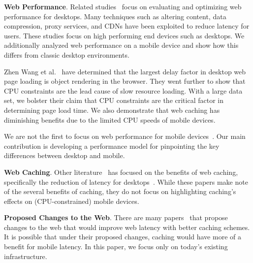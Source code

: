 \textbf{Web Performance}. Related studies~\cite{web-perf-2, web-perf-3} focus on evaluating and optimizing web performance for desktops. Many techniques such as altering content, data compression, proxy services, and CDNs have been exploited to reduce latency for users. These studies focus on high performing end devices such as desktops. We additionally analyzed web performance on a mobile device and show how this differs from classic desktop environments.

Zhen Wang et al.~\cite{CPU-plt-2, CPU-plt-3} have determined that the largest delay factor in desktop web page loading is object rendering in the browser. They went further to show that CPU constraints are the lead cause of slow resource loading.
With a large data set, we bolster their claim that CPU constraints are the critical factor in determining page load time. We also demonstrate that web caching has diminishing benefits due to the limited CPU speeds of mobile devices.

We are not the first to focus on web performance for mobile
devices~\cite{CPU-plt-2, CPU-plt-3}.
Our main contribution is developing a performance model for pinpointing the key differences between desktop
and mobile.

\textbf{Web Caching}. Other literature~\cite{web-caching-1, web-caching-2, web-caching-8, web-caching-9} has focused on the benefits of web caching, specifically the reduction of latency for desktops~\cite{web-caching-3, web-caching-4, web-caching-5, web-caching-6, web-caching-7}.
While these papers make note of the several benefits of caching, they do not
focus on highlighting caching's effects on (CPU-constrained) mobile devices.


\textbf{Proposed Changes to the Web}. There are many
papers~\cite{web-perf-4-new-design, web-caching-4-new-design,
web-caching-5-new-design, web-caching-latency-1-new-design,
web-caching-latency-2-new-design, web-caching-latency-3-new-design,
web-caching-latency-5-new-design, web-caching-latency-6-new-design,
web-caching-latency-7-new-design} that propose changes to the web that would
improve web latency with better caching schemes. It is possible that under their proposed changes, caching would have more of a benefit for mobile latency. In this paper, we focus only on today's existing infrastructure. %

